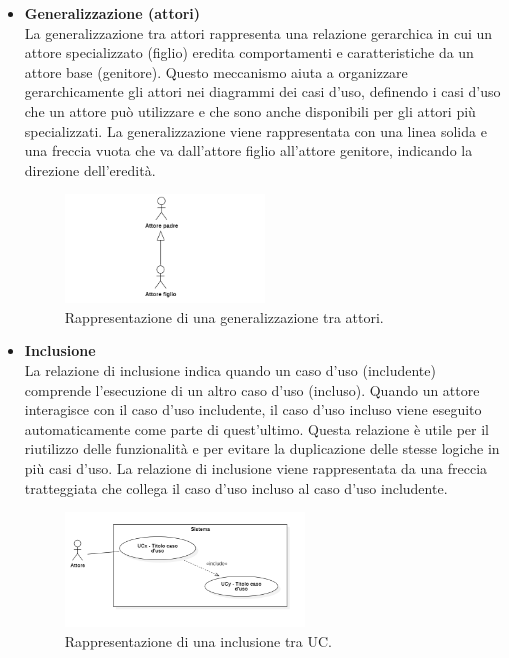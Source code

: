 \documentclass[10pt]{article}
\begin{document}
\begin{justify}
\begin{itemize}
            \item \textbf{Generalizzazione (attori)}\\
            La generalizzazione tra attori rappresenta una relazione gerarchica in cui un attore specializzato (figlio) eredita comportamenti e caratteristiche da un attore base (genitore). Questo meccanismo aiuta a organizzare gerarchicamente gli attori nei diagrammi dei casi d'uso, definendo i casi d'uso che un attore può utilizzare e che sono anche disponibili per gli attori più specializzati. La generalizzazione viene rappresentata con una linea solida e una freccia vuota che va dall'attore figlio all'attore genitore, indicando la direzione dell'eredità.
            \begin{figure}[H]
            \centering
            \includegraphics[width=0.5\textwidth]{GeneralizzazioneAttore.PNG}
            \caption{Rappresentazione di una generalizzazione tra attori.}
            \end{figure}

            \item \textbf{Inclusione}\\
            La relazione di inclusione indica quando un caso d'uso (includente) comprende l'esecuzione di un altro caso d'uso (incluso). Quando un attore interagisce con il caso d'uso includente, il caso d'uso incluso viene eseguito automaticamente come parte di quest'ultimo. Questa relazione è utile per il riutilizzo delle funzionalità e per evitare la duplicazione delle stesse logiche in più casi d'uso. La relazione di inclusione viene rappresentata da una freccia tratteggiata che collega il caso d'uso incluso al caso d'uso includente.
            \begin{figure}[H]
            \centering
            \includegraphics[width=0.6\textwidth]{InclusioneUC.PNG}
            \caption{Rappresentazione di una inclusione tra UC.}
            \end{figure}


\end{itemize}
\end{justify}
\end{document}
